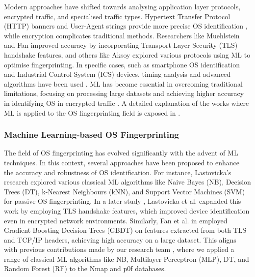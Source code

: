 Modern approaches have shifted towards analysing application layer protocols, encrypted traffic, and specialised traffic types. Hypertext Transfer Protocol (HTTP) banners and User-Agent strings provide more precise OS identification \cite{shah_http_2003}, while encryption complicates traditional methods. Researchers like Muehlstein and Fan \cite{matousek_gromovs_2014, fan_identify_2019} improved accuracy by incorporating Transport Layer Security (TLS) handshake features, and others like Aksoy \cite{aksoy_operating_2016} explored various protocols using ML to optimise fingerprinting. In specific cases, such as smartphone OS identification and Industrial Control System (ICS) devices, timing analysis and advanced algorithms have been used \cite{gurary_operating_2016, shen_hybrid-augmented_2018}. ML has become essential in overcoming traditional limitations, focusing on processing large datasets and achieving higher accuracy in identifying OS in encrypted traffic \cite{beverly_robust_2004, shamsi_faulds_2021, lastovicka_cybersecurity_2018}. A detailed explanation of the works where ML is applied to the OS fingerprinting field is exposed in .

\subsubsection{Machine Learning-based OS Fingerprinting}
\label{subsubsec:ml-based-os-fingerprinting}

The field of OS fingerprinting has evolved significantly with the advent of ML techniques. In this context, several approaches have been proposed to enhance the accuracy and robustness of OS identification. For instance, Lastovicka's research \cite{lastovicka_cybersecurity_2018} explored various classical ML algorithms like Naive Bayes (NB), Decision Trees (DT), k-Nearest Neighbours (kNN), and Support Vector Machines (SVM) for passive OS fingerprinting. In a later study \cite{lastovicka_usingTLS_2020}, Lastovicka et al. expanded this work by employing TLS handshake features, which improved device identification even in encrypted network environments. Similarly, Fan et al. in \cite{fan_identify_2019} employed Gradient Boosting Decision Trees (GBDT) on features extracted from both TLS and TCP/IP headers, achieving high accuracy on a large dataset. This aligns with previous contributions made by our research team \cite{perez-jove_applying_2021, perez-jove_tool_2023}, where we applied a range of classical ML algorithms like NB, Multilayer Perceptron (MLP), DT, and Random Forest (RF) to the Nmap and p0f databases.

